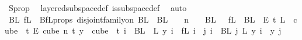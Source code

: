 \begin{isabellebody}
\ S{\isacharunderscore}{\kern0pt}prop\ \isamarkupfalse%
\ layered{\isacharunderscore}{\kern0pt}subspace{\isacharunderscore}{\kern0pt}def\ is{\isacharunderscore}{\kern0pt}subspace{\isacharunderscore}{\kern0pt}def\ \isamarkupfalse%
\ auto\isanewline
\isanewline
\ \ \ \ \isamarkupfalse%
\ BL\ fL\ \ BfL{\isacharunderscore}{\kern0pt}props{\isacharcolon}{\kern0pt}\ {\isachardoublequoteopen}disjoint{\isacharunderscore}{\kern0pt}family{\isacharunderscore}{\kern0pt}on\ BL\ {\isacharbraceleft}{\kern0pt}{\isachardot}{\kern0pt}{\isachardot}{\kern0pt}{}{\isacharbraceright}{\kern0pt}{\isachardoublequoteclose}\ {\isachardoublequoteopen}{\isasymUnion}{\isacharparenleft}{\kern0pt}BL\ {\isacharbackquote}{\kern0pt}\ {\isacharbraceleft}{\kern0pt}{\isachardot}{\kern0pt}{\isachardot}{\kern0pt}{}{\isacharbraceright}{\kern0pt}{\isacharparenright}{\kern0pt}\ {\isacharequal}{\kern0pt}\ {\isacharbraceleft}{\kern0pt}{\isachardot}{\kern0pt}{\isachardot}{\kern0pt}{\isacharless}{\kern0pt}n{\isacharbraceright}{\kern0pt}{\isachardoublequoteclose}\ \ {\isachardoublequoteopen}{\isacharparenleft}{\kern0pt}{\isacharbraceleft}{\kern0pt}{\isacharbraceright}{\kern0pt}\ {\isasymnotin}\ BL\ {\isacharbackquote}{\kern0pt}\ {\isacharbraceleft}{\kern0pt}{\isachardot}{\kern0pt}{\isachardot}{\kern0pt}{\isacharless}{\kern0pt}{}{\isacharbraceright}{\kern0pt}{\isacharparenright}{\kern0pt}{\isachardoublequoteclose}\ {\isachardoublequoteopen}fL\ {\isasymin}\ {\isacharparenleft}{\kern0pt}BL\ {}{\isacharparenright}{\kern0pt}\ {\isasymrightarrow}\isactrlsub E\ {\isacharbraceleft}{\kern0pt}{\isachardot}{\kern0pt}{\isachardot}{\kern0pt}{\isacharless}{\kern0pt}t{\isacharplus}{\kern0pt}{}{\isacharbraceright}{\kern0pt}{\isachardoublequoteclose}\ {\isachardoublequoteopen}L\ {\isasymin}\ {\isacharparenleft}{\kern0pt}cube\ {}\ {\isacharparenleft}{\kern0pt}t{\isacharplus}{\kern0pt}{}{\isacharparenright}{\kern0pt}{\isacharparenright}{\kern0pt}\ {\isasymrightarrow}\isactrlsub E\ {\isacharparenleft}{\kern0pt}cube\ n\ {\isacharparenleft}{\kern0pt}t{\isacharplus}{\kern0pt}{}{\isacharparenright}{\kern0pt}{\isacharparenright}{\kern0pt}{\isachardoublequoteclose}\ {\isachardoublequoteopen}{\isacharparenleft}{\kern0pt}{\isasymforall}y\ {\isasymin}\ cube\ {}\ {\isacharparenleft}{\kern0pt}t{\isacharplus}{\kern0pt}{}{\isacharparenright}{\kern0pt}{\isachardot}{\kern0pt}\ {\isacharparenleft}{\kern0pt}{\isasymforall}i\ {\isasymin}\ BL\ {}{\isachardot}{\kern0pt}\ L\ y\ i\ {\isacharequal}{\kern0pt}\ fL\ i{\isacharparenright}{\kern0pt}\ {\isasymand}\ {\isacharparenleft}{\kern0pt}{\isasymforall}j{\isacharless}{\kern0pt}{}{\isachardot}{\kern0pt}\ {\isasymforall}i\ {\isasymin}\ BL\ j{\isachardot}{\kern0pt}\ {\isacharparenleft}{\kern0pt}L\ y{\isacharparenright}{\kern0pt}\ i\ {\isacharequal}{\kern0pt}\ y\ j{\isacharparenright}{\kern0pt}{\isacharparenright}{\kern0pt}{\isachardoublequoteclose}\ \isamarkupfalse%

\end{isabellebody}
